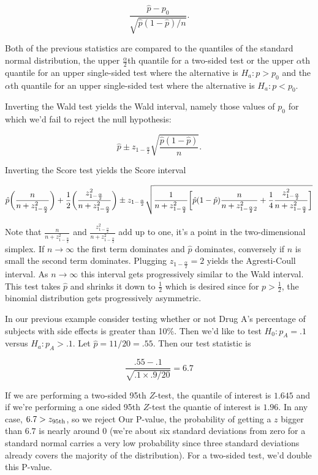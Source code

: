 \documentclass{homework}
\begin{document}
$$
\frac{\hat{p}-p_0}{\sqrt{\hat{p}(1-\hat{p})/n}}.
$$

Both of the previous statistics are compared to the quantiles of the standard normal distribution, the upper $\frac{\alpha}{2}$th quantile for a two-sided test or the upper $\alpha$th quantile for an upper single-sided test where the alternative is $H_a : p > p_0$ and the $\alpha$th quantile for an upper single-sided test where the alternative is $H_a : p < p_0$. 

Inverting the Wald test yields the Wald interval, namely those values of $p_0$ for which we'd fail to reject the null hypothesis:

$$
\hat{p} \pm z_{1-\frac{\alpha}{2}}\sqrt{\frac{\hat{p}(1-\hat{p})}{n}}.
$$

Inverting the Score test yields the Score interval

\begin{equation*}
\hat{p}\bigg(\frac{n}{n+z^2_{1-\frac{\alpha}{2}}}\bigg) + \frac{1}{2}\bigg(\frac{z^2_{1-\frac{\alpha}{2}}}{n+z^2_{1-\frac{\alpha}{2}}}\bigg) \\
\pm z_{1-\frac{\alpha}{2}} \sqrt{\frac{1}{n+z^2_{1-\frac{\alpha}{2}}} \bigg[\hat{p}(1-\hat{p})\frac{n}{n+z^2_{1-\frac{\alpha}{2}{2}}}+\frac{1}{4}\frac{z^2_{1-\frac{\alpha}{2}}}{n+z^2_{1-\frac{\alpha}{2}}}\bigg] }
\end{equation*}

Note that $\frac{n}{n+z^2_{1-\frac{\alpha}{2}}}$ and $\frac{z^2_{1-\frac{\alpha}{2}}}{n+z^2_{1-\frac{\alpha}{2}}}$ add up to one, it's a point in the two-dimensional simplex. If $n \rightarrow \infty$ the first term dominates and $\hat{p}$ dominates, conversely if $n$ is small the second term dominates. 
Plugging $z_{1-\frac{\alpha}{2}} = 2$ yields the Agresti-Coull interval. As $n \rightarrow \infty$ this interval gets progressively similar to the Wald interval. This test takes $\hat{p}$ and shrinks it down to $\frac{1}{2}$ which is desired since for $p > \frac{1}{2}$, the binomial distribution gets progressively asymmetric. 

\begin{tcolorbox}[title=Example continued]

In our previous example consider testing whether or not Drug A's percentage of subjects with side effects is greater than 10\%. Then we'd like to test $H_0 : p_A = .1$ versus $H_a: p_A > .1$. Let $\hat{p} = 11/20 = .55$. Then our test statistic is 

$$
\frac{.55 - .1}{\sqrt{.1 \times .9/20}} = 6.7
$$

If we are performing a two-sided  95th $Z$-test, the quantile of interest is $1.645$ and if we're performing a one sided 95th $Z$-test the quantie of interest is $1.96$. In any case, $6.7 > z_{\textnormal{95th}}$, so we reject Our P-value, the probability of getting a $z$ bigger than $6.7$ is nearly around 0 (we're about six standard deviations from zero for a standard normal carries a very low probability since three standard deviations already covers the majority of the distribution).  For a two-sided test, we'd double this P-value.
\end{tcolorbox}
\end{document}
